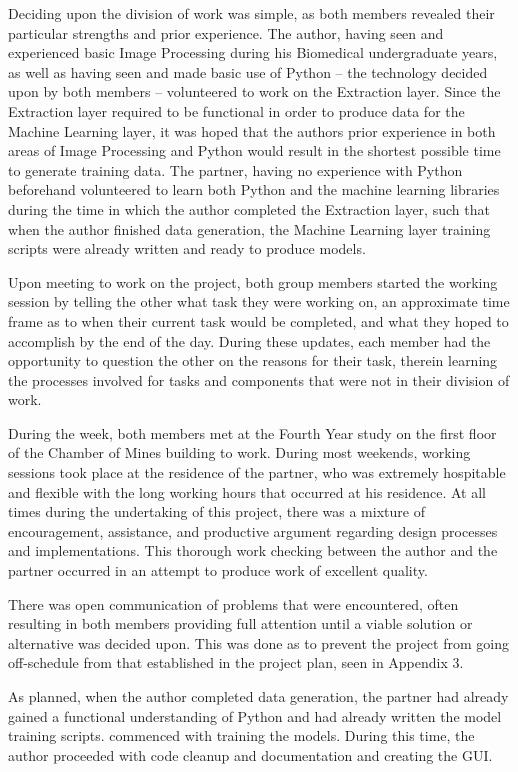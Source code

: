 \documentclass[conference, onecolumn]{IEEEtran}
\begin{document}
Deciding upon the division of work was simple, as both members revealed their particular strengths and prior experience.
The author, having seen and experienced basic Image Processing during his Biomedical undergraduate years, as well as having seen and made basic use of Python -- the technology decided upon by both members -- volunteered to work on the Extraction layer.
Since the Extraction layer required to be functional in order to produce data for the Machine Learning layer, it was hoped that the authors prior experience in both areas of Image Processing and Python would result in the shortest possible time to generate training data.
The partner, having no experience with Python beforehand volunteered to learn both Python and the machine learning libraries during the time in which the author completed the Extraction layer, such that when the author finished data generation, the Machine Learning layer training scripts were already written and ready to produce models.

Upon meeting to work on the project, both group members started the working session by telling the other what task they were working on, an approximate time frame as to when their current task would be completed, and what they hoped to accomplish by the end of the day.
During these updates, each member had the opportunity to question the other on the reasons for their task, therein learning the processes involved for tasks and components that were not in their division of work.

During the week, both members met at the Fourth Year study on the first floor of the Chamber of Mines building to work.
During most weekends, working sessions took place at the residence of the partner, who was extremely hospitable and flexible with the long working hours that occurred at his residence.
At all times during the undertaking of this project, there was a mixture of encouragement, assistance, and productive argument regarding design processes and implementations.
This thorough work checking between the author and the partner occurred in an attempt to produce work of excellent quality.

There was open communication of problems that were encountered, often resulting in both members providing full attention until a viable solution or alternative was decided upon.
This was done as to prevent the project from going off-schedule from that established in the project plan, seen in Appendix 3.

As planned, when the author completed data generation, the partner had already gained a functional understanding of Python and had already written the model training scripts. commenced with training the models.
During this time, the author proceeded with code cleanup and documentation and creating the GUI.
\end{document}

